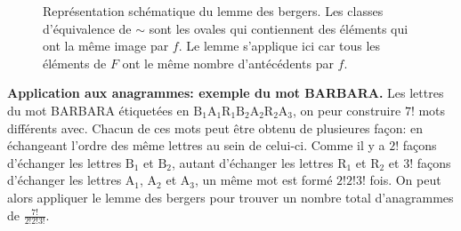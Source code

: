 \documentclass{article}
\renewenvironment{question_kholle}[2][ ]
{
	\subsection{\texorpdfstring{#2}{}}
	\notblank{#1}
	{
		\noindent #1
		\bigbreak
	}
	{}
	\begin{proof}
}
{
	\end{proof}
}
\begin{document}
\begin{question_kholle}
\begin{figure}[H]
		\caption{Représentation schématique du lemme des bergers. Les classes d'équivalence de $\sim$ sont les ovales qui contiennent des éléments qui ont la même image par $f$. Le lemme s'applique ici car tous les éléments de $F$ ont le même nombre d'antécédents par $f$.}
	\end{figure}

	\textbf{Application aux anagrammes: exemple du mot BARBARA.} Les lettres du mot BARBARA étiquetées en $\mathrm{B_{1}A_{1}R_{1}B_{2}A_{2}R_{2}A_{3}}$, on peur construire $7!$ mots différents avec. Chacun de ces mots peut être obtenu de plusieures façon: en échangeant l’ordre des même lettres au sein de celui-ci. Comme il y a $2!$ façons d’échanger les lettres $\mathrm{B_{1}}$ et $\mathrm{B_{2}}$, autant d’échanger les lettres $\mathrm{R_{1}}$ et $\mathrm{R_{2}}$ et $3!$ façons d’échanger les lettres $\mathrm{A_{1}}$, $\mathrm{A_{2}}$ et $\mathrm{A_{3}}$, un même mot est formé $2!2!3!$ fois. On peut alors appliquer le lemme des bergers pour trouver un nombre total d’anagrammes de $\frac{7!}{2!2!3!}$.
\end{question_kholle}
\end{document}
